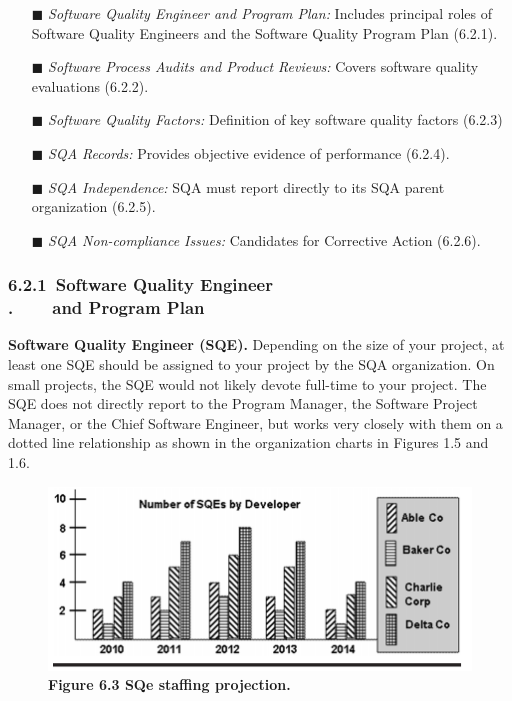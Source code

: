 \documentclass[10pt,twocolumn]{article}
\begin{document}
\begin{itemize}
	\item [$\blacksquare$]
	\textit{Software Quality Engineer and Program Plan:} Includes
principal roles of Software Quality Engineers and the
Software Quality Program Plan (6.2.1).
\item [$\blacksquare$]
\textit{Software Process Audits and Product Reviews:} Covers
software quality evaluations (6.2.2).
\item [$\blacksquare$]
\textit{Software Quality Factors:} Definition of key software
quality factors (6.2.3)
\item [$\blacksquare$]
\textit{SQA Records:} Provides objective evidence of performance (6.2.4).
\item [$\blacksquare$]
\textit{SQA Independence:} SQA must report directly to its
SQA parent organization (6.2.5).
\item [$\blacksquare$]
\textit{SQA Non-compliance Issues:} Candidates for Corrective
Action (6.2.6).
\end{itemize}
\subsubsection*{6.2.1 $\,$Software Quality Engineer\\ {\color{white}.} $\qquad$and Program Plan}
\textbf{Software Quality Engineer (SQE).} Depending on the size of
your project, at least one SQE should be assigned to your project
by the SQA organization. On small projects, the SQE would
not likely devote full-time to your project. The SQE does not
directly report to the Program Manager, the Software Project
Manager, or the Chief Software Engineer, but works very
closely with them on a dotted line relationship as shown in the
organization charts in Figures 1.5 and 1.6.

\begin{figure}[!ht]
	\begin{center}
		\includegraphics[width=0.95\linewidth]{1}
	\end{center}
	\caption*{\textbf{Figure 6.3 SQe staffing projection.}}
\end{figure}
\end{document}
